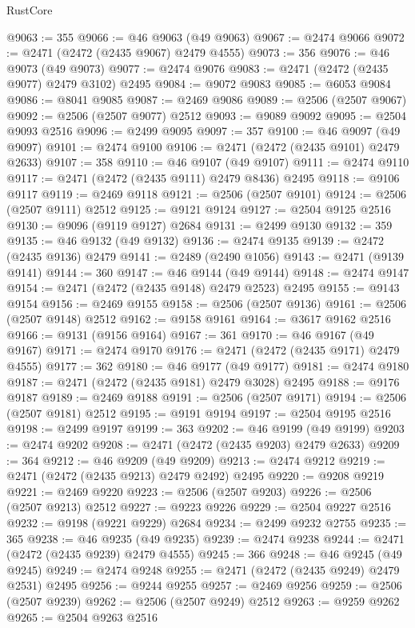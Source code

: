 \begin{lexlean}{RustCore}
\begin{coremodule}
@9063 := 355
@9066 := @46 @9063 (@49 @9063)
@9067 := @2474 @9066
@9072 := @2471 (@2472 (@2435 @9067) @2479 @4555)
@9073 := 356
@9076 := @46 @9073 (@49 @9073)
@9077 := @2474 @9076
@9083 := @2471 (@2472 (@2435 @9077) @2479 @3102) @2495
@9084 := @9072 @9083
@9085 := @6053 @9084
@9086 := @8041 @9085
@9087 := @2469 @9086
@9089 := @2506 (@2507 @9067)
@9092 := @2506 (@2507 @9077) @2512
@9093 := @9089 @9092
@9095 := @2504 @9093 @2516
@9096 := @2499 @9095
@9097 := 357
@9100 := @46 @9097 (@49 @9097)
@9101 := @2474 @9100
@9106 := @2471 (@2472 (@2435 @9101) @2479 @2633)
@9107 := 358
@9110 := @46 @9107 (@49 @9107)
@9111 := @2474 @9110
@9117 := @2471 (@2472 (@2435 @9111) @2479 @8436) @2495
@9118 := @9106 @9117
@9119 := @2469 @9118
@9121 := @2506 (@2507 @9101)
@9124 := @2506 (@2507 @9111) @2512
@9125 := @9121 @9124
@9127 := @2504 @9125 @2516
@9130 := @9096 (@9119 @9127) @2684
@9131 := @2499 @9130
@9132 := 359
@9135 := @46 @9132 (@49 @9132)
@9136 := @2474 @9135
@9139 := @2472 (@2435 @9136) @2479
@9141 := @2489 (@2490 @1056)
@9143 := @2471 (@9139 @9141)
@9144 := 360
@9147 := @46 @9144 (@49 @9144)
@9148 := @2474 @9147
@9154 := @2471 (@2472 (@2435 @9148) @2479 @2523) @2495
@9155 := @9143 @9154
@9156 := @2469 @9155
@9158 := @2506 (@2507 @9136)
@9161 := @2506 (@2507 @9148) @2512
@9162 := @9158 @9161
@9164 := @3617 @9162 @2516
@9166 := @9131 (@9156 @9164)
@9167 := 361
@9170 := @46 @9167 (@49 @9167)
@9171 := @2474 @9170
@9176 := @2471 (@2472 (@2435 @9171) @2479 @4555)
@9177 := 362
@9180 := @46 @9177 (@49 @9177)
@9181 := @2474 @9180
@9187 := @2471 (@2472 (@2435 @9181) @2479 @3028) @2495
@9188 := @9176 @9187
@9189 := @2469 @9188
@9191 := @2506 (@2507 @9171)
@9194 := @2506 (@2507 @9181) @2512
@9195 := @9191 @9194
@9197 := @2504 @9195 @2516
@9198 := @2499 @9197
@9199 := 363
@9202 := @46 @9199 (@49 @9199)
@9203 := @2474 @9202
@9208 := @2471 (@2472 (@2435 @9203) @2479 @2633)
@9209 := 364
@9212 := @46 @9209 (@49 @9209)
@9213 := @2474 @9212
@9219 := @2471 (@2472 (@2435 @9213) @2479 @2492) @2495
@9220 := @9208 @9219
@9221 := @2469 @9220
@9223 := @2506 (@2507 @9203)
@9226 := @2506 (@2507 @9213) @2512
@9227 := @9223 @9226
@9229 := @2504 @9227 @2516
@9232 := @9198 (@9221 @9229) @2684
@9234 := @2499 @9232 @2755
@9235 := 365
@9238 := @46 @9235 (@49 @9235)
@9239 := @2474 @9238
@9244 := @2471 (@2472 (@2435 @9239) @2479 @4555)
@9245 := 366
@9248 := @46 @9245 (@49 @9245)
@9249 := @2474 @9248
@9255 := @2471 (@2472 (@2435 @9249) @2479 @2531) @2495
@9256 := @9244 @9255
@9257 := @2469 @9256
@9259 := @2506 (@2507 @9239)
@9262 := @2506 (@2507 @9249) @2512
@9263 := @9259 @9262
@9265 := @2504 @9263 @2516

\end{coremodule}
\end{lexlean}
